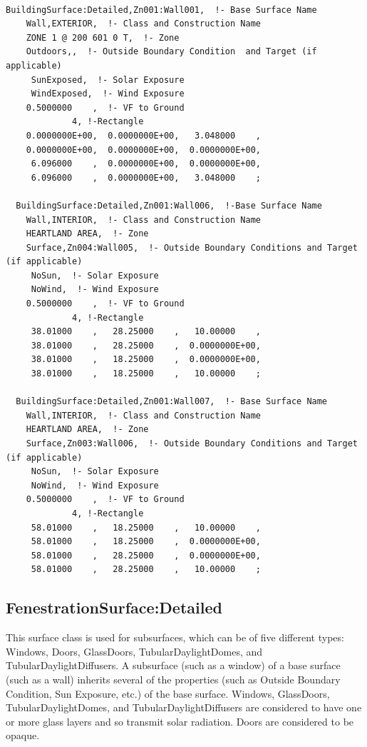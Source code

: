\begin{lstlisting}

BuildingSurface:Detailed,Zn001:Wall001,  !- Base Surface Name
    Wall,EXTERIOR,  !- Class and Construction Name
    ZONE 1 @ 200 601 0 T,  !- Zone
    Outdoors,,  !- Outside Boundary Condition  and Target (if applicable)
     SunExposed,  !- Solar Exposure
     WindExposed,  !- Wind Exposure
    0.5000000    ,  !- VF to Ground
             4, !-Rectangle
    0.0000000E+00,  0.0000000E+00,   3.048000    ,
    0.0000000E+00,  0.0000000E+00,  0.0000000E+00,
     6.096000    ,  0.0000000E+00,  0.0000000E+00,
     6.096000    ,  0.0000000E+00,   3.048000    ;

  BuildingSurface:Detailed,Zn001:Wall006,  !-Base Surface Name
    Wall,INTERIOR,  !- Class and Construction Name
    HEARTLAND AREA,  !- Zone
    Surface,Zn004:Wall005,  !- Outside Boundary Conditions and Target (if applicable)
     NoSun,  !- Solar Exposure
     NoWind,  !- Wind Exposure
    0.5000000    ,  !- VF to Ground
             4, !-Rectangle
     38.01000    ,   28.25000    ,   10.00000    ,
     38.01000    ,   28.25000    ,  0.0000000E+00,
     38.01000    ,   18.25000    ,  0.0000000E+00,
     38.01000    ,   18.25000    ,   10.00000    ;

  BuildingSurface:Detailed,Zn001:Wall007,  !- Base Surface Name
    Wall,INTERIOR,  !- Class and Construction Name
    HEARTLAND AREA,  !- Zone
    Surface,Zn003:Wall006,  !- Outside Boundary Conditions and Target (if applicable)
     NoSun,  !- Solar Exposure
     NoWind,  !- Wind Exposure
    0.5000000    ,  !- VF to Ground
             4, !-Rectangle
     58.01000    ,   18.25000    ,   10.00000    ,
     58.01000    ,   18.25000    ,  0.0000000E+00,
     58.01000    ,   28.25000    ,  0.0000000E+00,
     58.01000    ,   28.25000    ,   10.00000    ;
\end{lstlisting}

\subsection{FenestrationSurface:Detailed}\label{fenestrationsurfacedetailed}

This surface class is used for subsurfaces, which can be of five different types: Windows, Doors, GlassDoors, TubularDaylightDomes, and TubularDaylightDiffusers. A subsurface (such as a window) of a base surface (such as a wall) inherits several of the properties (such as Outside Boundary Condition, Sun Exposure, etc.) of the base surface. Windows, GlassDoors, TubularDaylightDomes, and TubularDaylightDiffusers are considered to have one or more glass layers and so transmit solar radiation. Doors are considered to be opaque.

